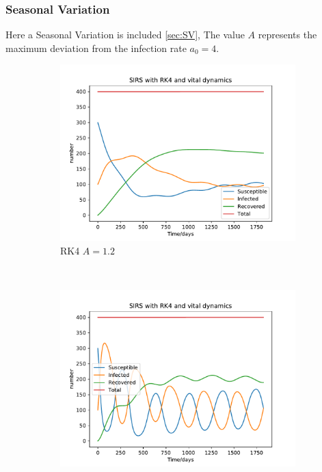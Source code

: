 \pagebreak
\subsubsection{Seasonal Variation}
Here a Seasonal Variation is included \ref{sec:SV}, The value $A$ represents the maximum deviation from the infection rate $a_0=4$.  
\begin{figure}[H]
    \centering
    \begin{subfigure}{0.49\textwidth}
        \centering
        \includegraphics[width=\linewidth]{../fig/newfig/Vaccine_A=12_T=5.pdf}
        \caption{RK4 $A=1.2$}
    \end{subfigure}%
     ~ 
    \begin{subfigure}{0.49\textwidth}
         \centering
         \includegraphics[width=\linewidth]{../fig/newfig/Vaccine_A=20_T=5.pdf}

\end{subfigure}
\end{figure}
